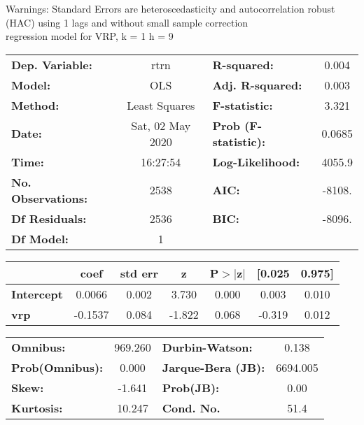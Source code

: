 Warnings: \newline
 [1] Standard Errors are heteroscedasticity and autocorrelation robust (HAC) using 1 lags and without small sample correction\\ 

regression model for VRP, k = 1 h = 9\begin{center}
\begin{tabular}{lclc}
\toprule
\textbf{Dep. Variable:}    &       rtrn       & \textbf{  R-squared:         } &     0.004   \\
\textbf{Model:}            &       OLS        & \textbf{  Adj. R-squared:    } &     0.003   \\
\textbf{Method:}           &  Least Squares   & \textbf{  F-statistic:       } &     3.321   \\
\textbf{Date:}             & Sat, 02 May 2020 & \textbf{  Prob (F-statistic):} &   0.0685    \\
\textbf{Time:}             &     16:27:54     & \textbf{  Log-Likelihood:    } &    4055.9   \\
\textbf{No. Observations:} &        2538      & \textbf{  AIC:               } &    -8108.   \\
\textbf{Df Residuals:}     &        2536      & \textbf{  BIC:               } &    -8096.   \\
\textbf{Df Model:}         &           1      & \textbf{                     } &             \\
\bottomrule
\end{tabular}
\begin{tabular}{lcccccc}
                   & \textbf{coef} & \textbf{std err} & \textbf{z} & \textbf{P$> |$z$|$} & \textbf{[0.025} & \textbf{0.975]}  \\
\midrule
\textbf{Intercept} &       0.0066  &        0.002     &     3.730  &         0.000        &        0.003    &        0.010     \\
\textbf{vrp}       &      -0.1537  &        0.084     &    -1.822  &         0.068        &       -0.319    &        0.012     \\
\bottomrule
\end{tabular}
\begin{tabular}{lclc}
\textbf{Omnibus:}       & 969.260 & \textbf{  Durbin-Watson:     } &    0.138  \\
\textbf{Prob(Omnibus):} &   0.000 & \textbf{  Jarque-Bera (JB):  } & 6694.005  \\
\textbf{Skew:}          &  -1.641 & \textbf{  Prob(JB):          } &     0.00  \\
\textbf{Kurtosis:}      &  10.247 & \textbf{  Cond. No.          } &     51.4  \\
\bottomrule
\end{tabular}
\end{center}

